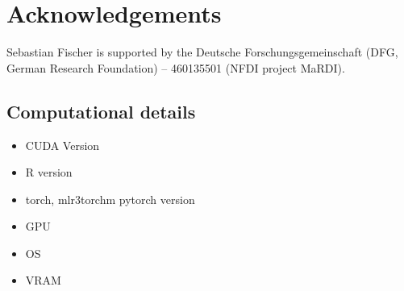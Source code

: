 \documentclass[article]{jss}
\theoremstyle{definition}
\begin{document}
%

\section*{Acknowledgements}

Sebastian Fischer is supported by the Deutsche Forschungsgemeinschaft (DFG, German Research Foundation) – 460135501 (NFDI project MaRDI).



\begin{appendix}

\section{Computational details}\label{app:comp-details}

\begin{itemize}
    \item CUDA Version
    \item R version
    \item torch, mlr3torchm pytorch version
    \item GPU
    \item OS
    \item VRAM
\end{itemize}

\end{appendix}
\end{document}
